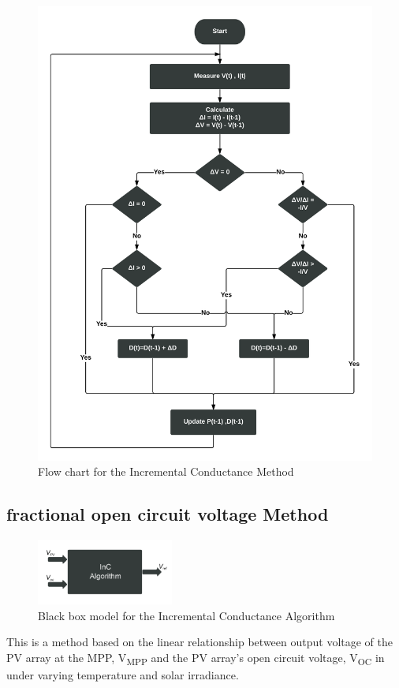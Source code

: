{   \begin{figure}[H]
      \begin{center}
      \includegraphics[width=\textwidth]{images/INc_flow}
      \caption{ Flow chart for the Incremental Conductance Method}
      \label{fig:inCflow}
      \end{center}
      \end{figure}
      
  \subsection{fractional open circuit voltage Method }
  
   \begin{figure}[H]
           \begin{center}
           \includegraphics[width=0.4\textwidth]{images/Frac_block}
           \caption{ Black box model for the Incremental Conductance Algorithm }
           \label{fig:Frac_block}
      \end{center}
    \end{figure}
  This is a method based on the linear relationship between output voltage of the PV array at the \ac{MPP}, V\textsubscript{MPP} and the PV array's open circuit voltage, V\textsubscript{OC} in under varying temperature and solar irradiance. \\
  
}

